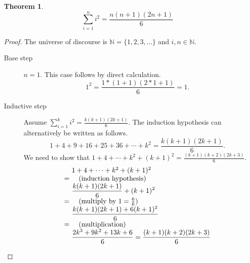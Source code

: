 \documentclass[a4paper,11pt]{article}
\makeatletter
\theoremstyle{plain}
\newtheorem{theorem}{Theorem}[section]
\theoremstyle{definition}
\newcommand{\ba}{\begin{array}}
\newcommand{\ea}{\end{array}}
\newenvironment{derivation}{\begin{displaymath}\ba{@{}r@{~}l@{}}}{\ea\end{displaymath}\ignorespacesafterend}
\newcommand{\reason}[1]{\quad (\text{#1})}
\makeatother
\begin{document}
\begin{theorem}
  \[
    \displaystyle\sum_{i=1}^ni^2 = \frac{n(n + 1)(2n + 1)}{6}
  \]
\end{theorem}
\begin{proof}
  The universe of discourse is $\mathbb{N} = \{1,2,3,\dots\}$ and $i,n\in\mathbb{N}$.
  \begin{description}
  \item[Base step] $n = 1$. This case follows by direct calculation.
    \[
      1^2 = \frac{1*(1 + 1)(2 * 1 + 1)}{6} = 1.
    \]
  \item[Inductive step] Assume
    $\sum_{i = 1}^ki^2 = \frac{k(k + 1)(2k + 1)}{6}$. The induction
    hypothesis can alternatively be written as follows.
    \[
      \displaystyle 1+4+9+16+25+36+\cdots+k^2 = \frac{k(k+1)(2k+1)}{6}.
    \]
    We need to show that $1+4+\cdots+k^2+(k + 1)^2 = \frac{(k+1)(k+2)(2k+3)}{6}$.
    \begin{derivation}
      &1+4+\cdots+k^2+(k+1)^2\\
      =& \reason{induction hypothesis}\\
      &\displaystyle\frac{k(k+1)(2k+1)}{6} + (k+1)^2\\
      =& \reason{multiply by $1 = \frac{6}{6}$}\\
      &\displaystyle\frac{k(k+1)(2k+1)+6(k+1)^2}{6}\\
      =& \reason{multiplication}\\
      &\displaystyle\frac{2k^3+9k^2+13k+6}{6} = \frac{(k+1)(k+2)(2k+3)}{6}\\
    \end{derivation}
  \end{description}
\end{proof}
\end{document}
